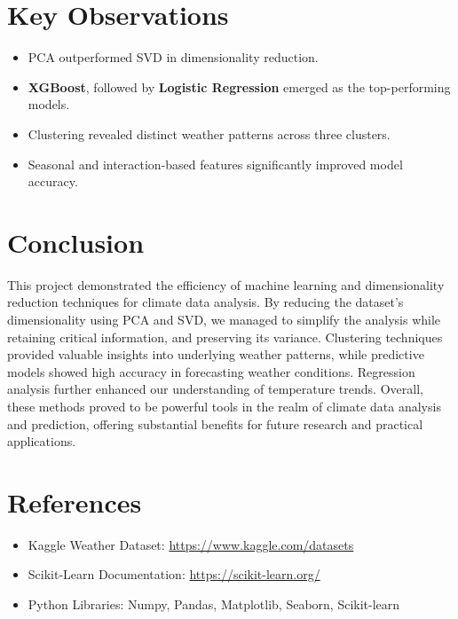 \documentclass[12pt]{article}
\begin{document}
\section{Key Observations}
\begin{itemize}
    \item PCA outperformed SVD in dimensionality reduction.
    \item \textbf{XGBoost}, followed by \textbf{Logistic Regression} emerged as the top-performing models.
    \item Clustering revealed distinct weather patterns across three clusters.
    \item Seasonal and interaction-based features significantly improved model accuracy.
\end{itemize}

\section{Conclusion}
This project demonstrated the efficiency of machine learning and dimensionality reduction techniques for climate data analysis. By reducing the dataset’s dimensionality using PCA and SVD, we managed to simplify the analysis while retaining critical information, and preserving its variance.
Clustering techniques provided valuable insights into underlying weather patterns, while predictive models showed high accuracy in forecasting weather conditions. Regression analysis further enhanced our understanding of temperature trends. Overall, these methods proved to be powerful tools in the realm of climate data analysis and prediction, offering substantial benefits for future research and practical applications.

\section*{References}
\begin{itemize}
    \item Kaggle Weather Dataset: \url{https://www.kaggle.com/datasets}
    \item Scikit-Learn Documentation: \url{https://scikit-learn.org/}
    \item Python Libraries: Numpy, Pandas, Matplotlib, Seaborn, Scikit-learn
\end{itemize}

\appendix
\end{document}
